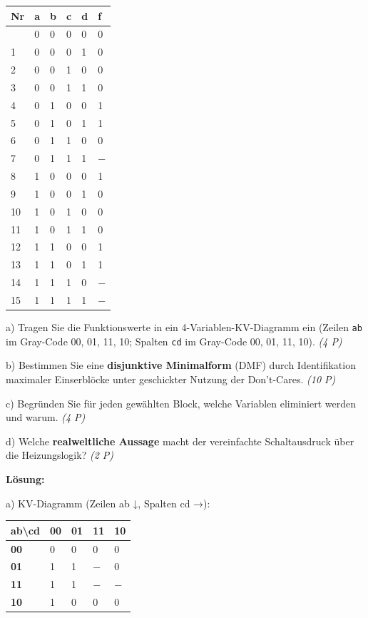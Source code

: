 \documentclass[11pt, a4paper]{article}
\begin{document}
{\small
\begin{tabularx}{\linewidth}{XXXXXX}
\hline
\rowcolor{tableheadbg}
{\color{white}\textbf{Nr}} & {\color{white}\textbf{a}} & {\color{white}\textbf{b}} & {\color{white}\textbf{c}} & {\color{white}\textbf{d}} & {\color{white}\textbf{f}} \\[2pt]
\hline
\endhead
\hline
\endfoot
0 & 0 & 0 & 0 & 0 & 0 \\
1 & 0 & 0 & 0 & 1 & 0 \\
2 & 0 & 0 & 1 & 0 & 0 \\
3 & 0 & 0 & 1 & 1 & 0 \\
4 & 0 & 1 & 0 & 0 & 1 \\
5 & 0 & 1 & 0 & 1 & 1 \\
6 & 0 & 1 & 1 & 0 & 0 \\
7 & 0 & 1 & 1 & 1 & − \\
8 & 1 & 0 & 0 & 0 & 1 \\
9 & 1 & 0 & 0 & 1 & 0 \\
10 & 1 & 0 & 1 & 0 & 0 \\
11 & 1 & 0 & 1 & 1 & 0 \\
12 & 1 & 1 & 0 & 0 & 1 \\
13 & 1 & 1 & 0 & 1 & 1 \\
14 & 1 & 1 & 1 & 0 & − \\
15 & 1 & 1 & 1 & 1 & − \\
\end{tabularx}
}


a) Tragen Sie die Funktionswerte in ein 4-Variablen-KV-Diagramm ein (Zeilen \texttt{ab} im Gray-Code 00, 01, 11, 10; Spalten \texttt{cd} im Gray-Code 00, 01, 11, 10). \textit{(4 P)}


b) Bestimmen Sie eine \textbf{disjunktive Minimalform} (DMF) durch Identifikation maximaler Einserblöcke unter geschickter Nutzung der Don't-Cares. \textit{(10 P)}


c) Begründen Sie für jeden gewählten Block, welche Variablen eliminiert werden und warum. \textit{(4 P)}


d) Welche \textbf{realweltliche Aussage} macht der vereinfachte Schaltausdruck über die Heizungslogik? \textit{(2 P)}


\textbf{Lösung:}


a) KV-Diagramm (Zeilen ab ↓, Spalten cd →):



{\small
\begin{tabularx}{\linewidth}{XXXXX}
\hline
\rowcolor{tableheadbg}
{\color{white}\textbf{ab\textbackslash{}cd}} & {\color{white}\textbf{00}} & {\color{white}\textbf{01}} & {\color{white}\textbf{11}} & {\color{white}\textbf{10}} \\[2pt]
\hline
\endhead
\hline
\endfoot
\textbf{00} & 0 & 0 & 0 & 0 \\
\textbf{01} & 1 & 1 & − & 0 \\
\textbf{11} & 1 & 1 & − & − \\
\textbf{10} & 1 & 0 & 0 & 0 \\
\end{tabularx}
}
\end{document}
